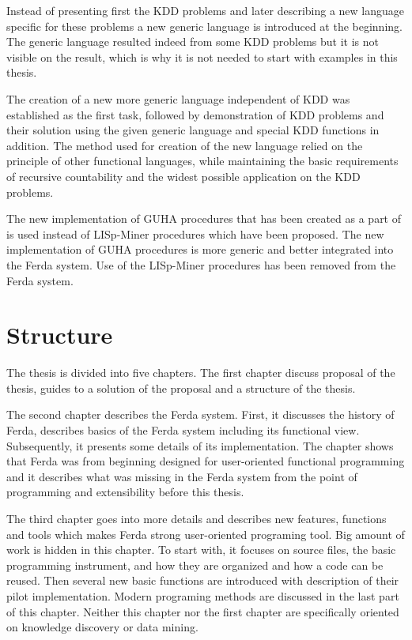 \documentclass[a4paper,12pt]{book}
\begin{document}
Instead of presenting first the KDD problems and later describing a new language specific for these problems a new generic language is introduced at the beginning. The generic language resulted indeed from some KDD problems but it is not visible on the result, which is why it is not needed to start with examples in this thesis.

The creation of a new more generic language independent of KDD was established as the first task, followed by demonstration of KDD problems and their solution using the given generic language and special KDD functions in addition. The method used for creation of the new language relied on the principle of other functional languages, while maintaining the basic requirements of recursive countability and the widest possible application on the KDD problems.


The new implementation of GUHA procedures that has been created as a part of \cite[diploma thesis of Tomáš Kuchař]{thesisKuchar} is used instead of LISp-Miner procedures which have been proposed. The new implementation of GUHA procedures is more generic and better integrated into the Ferda system. Use of the LISp-Miner procedures has been removed from the Ferda system.

\section{Structure}
The thesis is divided into five chapters. The first chapter discuss proposal of the thesis, guides to a solution of the proposal and a structure of the thesis.

The second chapter describes the Ferda system. First, it discusses the history of Ferda, describes basics of the Ferda system including its functional view. Subsequently, it presents some details of its implementation. The chapter shows that Ferda was from beginning designed for user-oriented functional programming and it describes what was missing in the Ferda system from the point of programming and extensibility before this thesis.

The third chapter goes into more details and describes new features, functions and tools which makes Ferda strong user-oriented programing tool. Big amount of work is hidden in this chapter. To start with, it focuses on source files, the basic programming instrument, and how they are organized and how a code can be reused. Then several new basic functions are introduced with description of their pilot implementation. Modern programing methods are discussed in the last part of this chapter. Neither this chapter nor the first chapter are specifically oriented on knowledge discovery or data mining.
\end{document}
